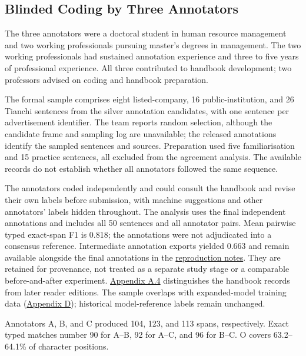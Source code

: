 \subsection{Blinded Coding by Three Annotators}
The three annotators were a doctoral student in human resource management and two working professionals pursuing master's degrees in management. The two working professionals had sustained annotation experience and three to five years of professional experience. All three contributed to handbook development; two professors advised on coding and handbook preparation.

The formal sample comprises eight listed-company, 16 public-institution, and 26 Tianchi sentences from the silver annotation candidates, with one sentence per advertisement identifier. The team reports random selection, although the candidate frame and sampling log are unavailable; the released annotations identify the sampled sentences and sources. Preparation used five familiarisation and 15 practice sentences, all excluded from the agreement analysis. The available records do not establish whether all annotators followed the same sequence.

\begin{sloppypar}
The annotators coded independently and could consult the handbook and revise their own labels before submission, with machine suggestions and other annotators' labels hidden throughout. The analysis uses the final independent annotations and includes all 50 sentences and all annotator pairs. Mean pairwise typed exact-span F1 is 0.818; the annotations were not adjudicated into a consensus reference. Intermediate annotation exports yielded 0.663 and remain available alongside the final annotations in the \href{https://github.com/AlfredJamesLi/chinese-skillspan-benchmark/tree/main/reproduction/style_revision_20261005}{reproduction notes}. They are retained for provenance, not treated as a separate study stage or a comparable before-and-after experiment. \hyperref[sec:guide-version-history]{Appendix A.4} distinguishes the handbook records from later reader editions. The sample overlaps with expanded-model training data (\hyperref[app:d]{Appendix D}); historical model-reference labels remain unchanged.
\end{sloppypar}

Annotators A, B, and C produced 104, 123, and 113 spans, respectively. Exact typed matches number 90 for A--B, 92 for A--C, and 96 for B--C. O covers 63.2--64.1\% of character positions.

